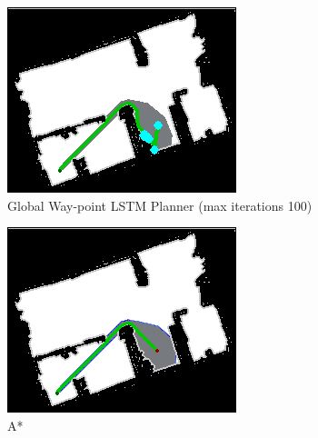 \begin{figure}[]
  \begin{subfigure}[b]{0.38\linewidth}
    \includegraphics[width=\linewidth]{images/screenshot_143.png}
     \caption{Global Way-point LSTM Planner (max iterations 100)}
  \end{subfigure}
  \hfill
  \begin{subfigure}[b]{0.38\linewidth}
    \includegraphics[width=\linewidth]{images/screenshot_118.png}
     \caption{A*\newline}
  \end{subfigure}
  \newline
  \begin{subfigure}[b]{0.38\linewidth}

\end{subfigure}
\end{figure}
